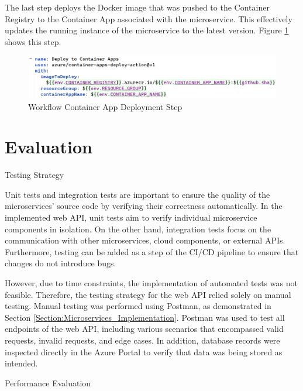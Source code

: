 \documentclass[12pt, reqno, oneside]{amsbook}
\makeatletter
\def\section{\@startsection{section}{1}%
      \z@{.5\linespacing\@plus.7\linespacing}{.25\linespacing}%
      {\normalfont\bfseries\flushleft}}
\theoremstyle{definition}
\theoremstyle{definition}
\numberwithin{section}{chapter}
\numberwithin{table}{chapter}
\numberwithin{figure}{chapter}
\makeatother
\begin{document}
The last step deploys the Docker image that was pushed to the Container Registry to the Container App associated with the microservice. This effectively updates the running instance of the microservice to the latest version. Figure \ref{Figure:GithubWorkflowContainerAppDeployment} shows this step.

\begin{figure}[H]
  \centering
  \includegraphics[width=1\linewidth]{images/GithubWorkflowContainerAppDeployment.png}
  \caption{\label{Figure:GithubWorkflowContainerAppDeployment}Workflow Container App Deployment Step}
\end{figure}

\chapter{Evaluation}
\label{Chapter:Evaluation}
\section{Testing Strategy}
\label{Section:Testing_Strategy}

Unit tests and integration tests are important to ensure the quality of the microservices' source code by verifying their correctness automatically. In the implemented web \ac{API}, unit tests aim to verify individual microservice components in isolation. On the other hand, integration tests focus on the communication with other microservices, cloud components, or external \acp{API}. Furthermore, testing can be added as a step of the CI/CD pipeline to ensure that changes do not introduce bugs.

However, due to time constraints, the implementation of automated tests was not feasible. Therefore, the testing strategy for the web \ac{API} relied solely on manual testing. Manual testing was performed using Postman, as demonstrated in Section \ref{Section:Microservices_Implementation}. Postman was used to test all endpoints of the web \ac{API}, including various scenarios that encompassed valid requests, invalid requests, and edge cases. In addition, database records were inspected directly in the Azure Portal to verify that data was being stored as intended.

\section{Performance Evaluation}
\label{Section:Performance_Evaluation}
\end{document}
